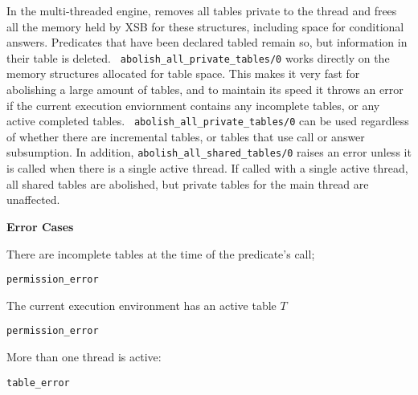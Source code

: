 \begin{description}
\begin{description}
%
In the multi-threaded engine, removes all tables private to the thread
and frees all the memory held by XSB for these structures, including
space for conditional answers.  Predicates that have been declared
tabled remain so, but information in their table is deleted.  {\tt
  abolish\_all\_private\_tables/0} works directly on the memory
structures allocated for table space.  This makes it very fast for
abolishing a large amount of tables, and to maintain its speed it
throws an error if the current execution enviornment contains any
incomplete tables, or any active completed tables.  {\tt
  abolish\_all\_private\_tables/0} can be used regardless of whether
there are incremental tables, or tables that use call or answer
subsumption.  In addition, {\tt abolish\_all\_shared\_tables/0} raises
an error unless it is called when there is a single active thread.  If
called with a single active thread, all shared tables are abolished,
but private tables for the main thread are unaffected.


{\bf Error Cases}
\bi
\item There are incomplete tables at the time of the predicate's call;
\bi
\item 	{\tt permission\_error}
\ei
\item The current execution environment has an active table $T$
\bi
\item 	{\tt permission\_error}
\ei
\item More than one thread is active:
\bi
\item 	{\tt table\_error}
\ei
%
%
\ei

\comment{





}
\end{description}
\end{description}
